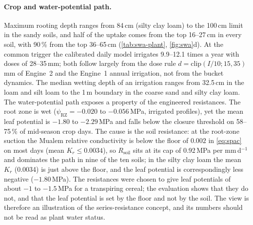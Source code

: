 \paragraph{Crop and water-potential path.} Maximum rooting depth ranges from 84\,cm (silty clay loam) to the 100\,cm limit in the sandy soils, and half of the uptake comes from the top 16--27\,cm in every soil, with 90\,\% from the top 36--65\,cm (\cref{tab:swa-plant}, \cref{fig:swa}d). At the common trigger the calibrated daily model irrigates 9.9--12.1 times a year with doses of 28--35\,mm; both follow largely from the dose rule $d=\mathrm{clip}(I/10;15,35)$\,mm of Engine~2 and the Engine~1 annual irrigation, not from the bucket dynamics. The median wetting depth of an irrigation ranges from 32.5\,cm in the loam and silt loam to the 1\,m boundary in the coarse sand and silty clay loam. The water-potential path exposes a property of the engineered resistances. The root zone is wet ($\psi_{\mathrm{RZ}}=-0.020$ to $-0.056$\,MPa, irrigated profiles), yet the mean leaf potential is $-1.80$ to $-2.29$\,MPa and falls below the closure threshold on 58--75\,\% of mid-season crop days. The cause is the soil resistance: at the root-zone suction the Mualem relative conductivity is below the floor of $0.002$ in \cref{eq:spac} on most days (mean $K_r\le0.0034$), so $R_{\mathrm{soil}}$ sits at its cap of 0.92\,MPa per mm\,d$^{-1}$ and dominates the path in nine of the ten soils; in the silty clay loam the mean $K_r$ (0.0034) is just above the floor, and the leaf potential is correspondingly less negative ($-1.80$\,MPa). The resistances were chosen to give leaf potentials of about $-1$ to $-1.5$\,MPa for a transpiring cereal; the evaluation shows that they do not, and that the leaf potential is set by the floor and not by the soil. The view is therefore an illustration of the series-resistance concept, and its numbers should not be read as plant water status.


